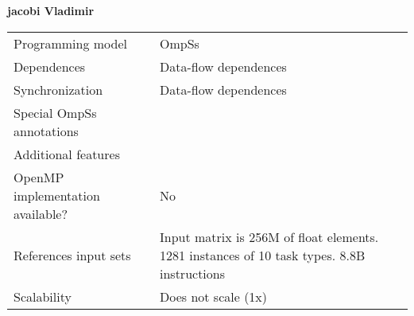 \section*{}
\label{jacobi_vladimir}
\centering
\Huge
\textbf{jacobi Vladimir}

\begin{table}[h!]
  \large
  \centering
  \begin{tabular}{|l|l|}
    \hline
    Programming model                & OmpSs \\
    Dependences                      & Data-flow dependences \\
    Synchronization                  & Data-flow dependences \\
    Special OmpSs annotations        &  \\
    Additional features              &  \\
    OpenMP implementation available? & No \\
    References input sets            & Input matrix is 256M of float elements. 1281 instances of 10 task types. 8.8B instructions \\
    Scalability                      & Does not scale (1x) \\
    \hline
  \end{tabular}
\end{table}

\newpage
